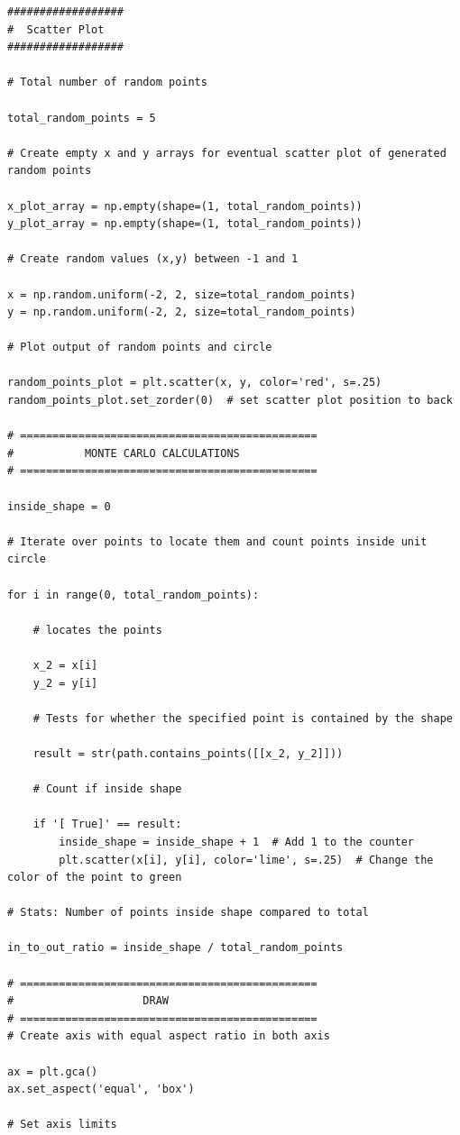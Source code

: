 \documentclass[11pt]{article}
\begin{document}
\begin{singlespace}
\begin{lstlisting}
##################
#  Scatter Plot
##################

# Total number of random points

total_random_points = 5

# Create empty x and y arrays for eventual scatter plot of generated random points

x_plot_array = np.empty(shape=(1, total_random_points))
y_plot_array = np.empty(shape=(1, total_random_points))

# Create random values (x,y) between -1 and 1

x = np.random.uniform(-2, 2, size=total_random_points)
y = np.random.uniform(-2, 2, size=total_random_points)

# Plot output of random points and circle

random_points_plot = plt.scatter(x, y, color='red', s=.25)
random_points_plot.set_zorder(0)  # set scatter plot position to back

# ==============================================
#           MONTE CARLO CALCULATIONS
# ==============================================

inside_shape = 0

# Iterate over points to locate them and count points inside unit circle

for i in range(0, total_random_points):

    # locates the points

    x_2 = x[i]
    y_2 = y[i]

    # Tests for whether the specified point is contained by the shape

    result = str(path.contains_points([[x_2, y_2]]))

    # Count if inside shape

    if '[ True]' == result:
        inside_shape = inside_shape + 1  # Add 1 to the counter
        plt.scatter(x[i], y[i], color='lime', s=.25)  # Change the color of the point to green

# Stats: Number of points inside shape compared to total

in_to_out_ratio = inside_shape / total_random_points

# ==============================================
#                    DRAW
# ==============================================
# Create axis with equal aspect ratio in both axis

ax = plt.gca()
ax.set_aspect('equal', 'box')

# Set axis limits


\end{lstlisting}
\end{singlespace}
\end{document}
